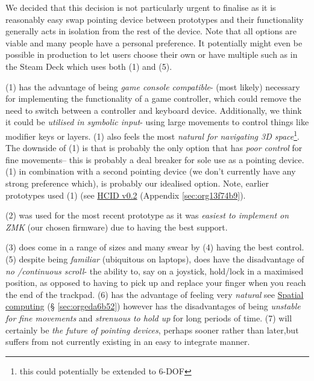 \documentclass[logo,bsc,singlespacing,parskip]{infthesis}
\begin{document}
We decided that this decision is not particularly urgent to finalise as it is reasonably easy swap pointing device between prototypes and their functionality generally acts in isolation from the rest of the device.
Note that all options are viable and many people have a personal preference.
It potentially might even be possible in production to let users choose their own or have multiple such as in the Steam Deck \autocite{SteamDeck2022}  which uses both (1) and (5).

(1) has the advantage of being \emph{game console compatible}- (most likely) necessary for implementing the functionality of a game controller, which could remove the need to switch between a controller and keyboard device.
Additionally, we think it could be \emph{utilised in symbolic input}- using large movements to control things like modifier keys or layers.
(1) also feels the most \emph{natural for navigating 3D space}\footnote{this could potentially be extended to 6-DOF}.
The downside of (1) is that is probably the only option that has \emph{poor control} for fine movements-- this is probably a deal breaker for sole use as a pointing device.
(1) in combination with a second pointing device (we don't currently have any strong preference which), is probably our idealised option.
Note, earlier prototypes used (1) (see \hyperref[sec:org13f74b9]{HCID v0.2} (Appendix \ref{sec:org13f74b9}).

(2) was used for the most recent prototype as it was \emph{easiest to implement on ZMK} (our chosen firmware) due to having the best support.

(3) does come in a range of sizes and many swear by (4) having the best control.
(5) despite being \emph{familiar} (ubiquitous on laptops), does have the disadvantage of \emph{no /continuous scroll}- the ability to, say on a joystick, hold/lock in a maximised position, as opposed to having to pick up and replace your finger when you reach the end of the trackpad.
(6) has the advantage of feeling very \emph{natural} see \hyperref[sec:orgeda6b52]{Spatial computing} (§ \ref{sec:orgeda6b52}) however has the disadvantages of being \emph{unstable for fine movements} and \emph{strenuous to hold up} for long periods of time.
(7) will certainly be \emph{the future of pointing devices}, perhaps sooner rather than later,but suffers from not currently existing in an easy to integrate manner.
\end{document}
